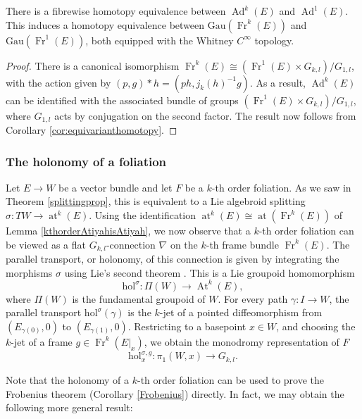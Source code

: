 \documentclass[10pt]{amsart}
\newcommand{\Fr}{{\operatorname{Fr}}}
\DeclareMathOperator{\At}{At}
\DeclareMathOperator{\Ad}{Ad}
\DeclareMathOperator{\at}{at}
\numberwithin{theoremalpha}{section}
\numberwithin{equation}{section}
\numberwithin{definition}{section}
\numberwithin{theorem}{section}
\numberwithin{proposition}{section}
\numberwithin{lemma}{section}
\numberwithin{example}{section}
\numberwithin{remark}{section}
\numberwithin{corollary}{section}
\numberwithin{question}{section}
\numberwithin{problem}{section}
\numberwithin{assumption}{section}
\theoremstyle{named}
\numberwithin{equation}{section}
\begin{document}
\begin{lemma} \label{lem:gaugehomotopy}
There is a fibrewise homotopy equivalence between $\Ad^k(E)$ and $\Ad^1(E)$. This induces a homotopy equivalence between $\mathrm{Gau}(\Fr^k(E))$ and $\mathrm{Gau}(\Fr^1(E))$, both equipped with the Whitney $C^{\infty}$ topology. 
\end{lemma}
\begin{proof}
There is a canonical isomorphism $\Fr^{k}(E) \cong (\Fr^1(E) \times G_{k,l})/G_{1,l}$, with the action given by $(p,g) \ast h = (ph, j_{k}(h)^{-1}g)$. As a result, $\Ad^k(E)$ can be identified with the associated bundle of groups $(\Fr^1(E) \times G_{k,l})/G_{1,l}$, where $G_{1,l}$ acts by conjugation on the second factor. The result now follows from Corollary \ref{cor:equivarianthomotopy}. 
\end{proof}

\subsubsection{The holonomy of a foliation} \label{holonomydefsection}
Let $E \to W$ be a vector bundle and let $F$ be a $k$-th order foliation. As we saw in Theorem \ref{splittingprop}, this is equivalent to a Lie algebroid splitting $\sigma : TW \to \at^{k}(E)$. Using the identification $\at^{k}(E) \cong \at(\Fr^{k}(E)) $ of Lemma \ref{kthorderAtiyahisAtiyah}, we now observe that a $k$-th order foliation can be viewed as a flat $G_{k,l}$-connection $\nabla$ on the $k$-th frame bundle $\Fr^{k}(E)$. The parallel transport, or holonomy, of this connection is given by integrating the morphisms $\sigma$ using Lie's second theorem \cite{mackenzie2000integration, moerdijk2002integrability}. This is a Lie groupoid homomorphism 
\[
\mathrm{hol}^{\sigma}: \Pi(W) \to \At^{k}(E),
\]
where $\Pi(W)$ is the fundamental groupoid of $W$. For every path $\gamma: I \to W$, the parallel transport $\mathrm{hol}^{\sigma}(\gamma)$ is the $k$-jet of a pointed diffeomorphism from $(E_{\gamma(0)}, 0)$ to $(E_{\gamma(1)}, 0)$. Restricting to a basepoint $x \in W$, and choosing the $k$-jet of a frame $g \in \Fr^{k}(E|_{x})$, we obtain the monodromy representation of $F$
\[
\mathrm{hol}^{\sigma, g}_{x} : \pi_1(W,x) \to G_{k,l}. 
\]

Note that the holonomy of a $k$-th order foliation can be used to prove the Frobenius theorem (Corollary \ref{Frobenius}) directly. In fact, we may obtain the following more general result:
\end{document}
